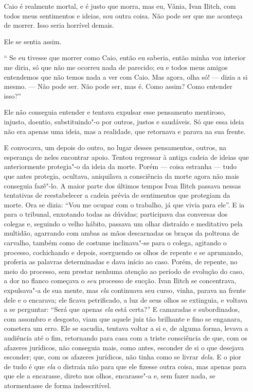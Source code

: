 Caio é realmente mortal, e é justo que morra, mas eu, Vânia, Ivan
Ilitch, com todos meus sentimentos e ideias, sou outra coisa. Não pode
ser que me aconteça de morrer. Isso seria horrível demais.

Ele se sentia assim.

`` Se eu tivesse que morrer como Caio, então eu saberia, então minha voz
interior me diria, só que não me ocorreu nada de parecido; eu e todos
meus amigos entendemos que não temos nada a ver com Caio. Mas agora,
olha só! --- dizia a si mesmo. --- Não pode ser. Não pode ser, mas é. Como
assim? Como entender isso?''

Ele não conseguia entender e tentava expulsar esse pensamento mentiroso,
injusto, doentio, substituindo"-o por outros, justos e saudáveis. Só que
essa ideia não era apenas uma ideia, mas a realidade, que retornava e
parava na sua frente.

E convocava, um depois do outro, no lugar desses pensamentos, outros, na
esperança de neles encontrar apoio. Tentou regressar à antiga cadeia de
ideias que anteriormente protegia"-o da ideia da morte. Porém --- coisa
estranha --- tudo que antes protegia, ocultava, aniquilava a consciência
da morte agora não mais conseguia fazê"-lo. A maior parte dos últimos
tempos Ivan Ilitch passava nessas tentativas de reestabelecer a cadeia
prévia de sentimentos que protegiam da morte. Ora se dizia: ``Vou me
ocupar com o trabalho, já que vivia para ele''. E ia para o tribunal,
enxotando todas as dúvidas; participava das conversas dos colegas e,
seguindo o velho hábito, passava um olhar distraído e meditativo pela
multidão, agarrando com ambas as mãos descarnadas os braços da poltrona
de carvalho, também como de costume inclinava"-se para o colega, agitando
o processo, cochichando e depois, soerguendo os olhos de repente e se
aprumando, proferia as palavras determinadas e dava início ao caso.
Porém, de repente, no meio do processo, sem prestar nenhuma atenção ao
período de evolução do caso, a dor no flanco começava o \emph{seu}
processo de sucção. Ivan Ilitch se concentrava, expulsava"-a de sua
mente, mas \emph{ela} continuava seu curso, vinha, parava na frente dele
e o encarava; ele ficava petrificado, a luz de seus olhos se extinguia,
e voltava a se perguntar: ``Será que apenas \emph{ela} está certa?'' E
camaradas e subordinados, com assombro e desgosto, viam que aquele juiz
tão brilhante e fino se enganara, cometera um erro. Ele se sacudia,
tentava voltar a si e, de alguma forma, levava a audiência até o fim,
retornando para casa com a triste consciência de que, com os afazeres
jurídicos, não conseguia mais, como antes, esconder de si o que desejava
esconder; que, com os afazeres jurídicos, não tinha como se livrar
\emph{dela.} E o pior de tudo é que \emph{ela} o distraía não para que
ele fizesse outra coisa, mas apenas para que ele a encarasse, direto nos
olhos, encarasse"-a e, sem fazer nada, se atormentasse de forma
indescritível.

